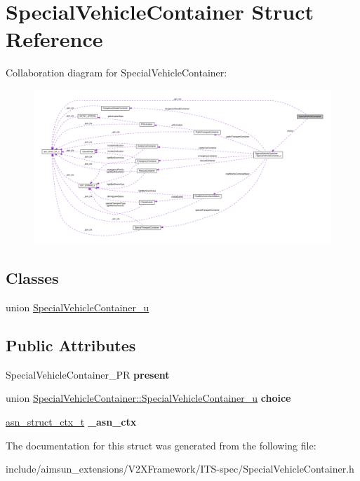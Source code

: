 \hypertarget{structSpecialVehicleContainer}{}\section{Special\+Vehicle\+Container Struct Reference}
\label{structSpecialVehicleContainer}


Collaboration diagram for Special\+Vehicle\+Container\+:\nopagebreak
\begin{figure}[H]
\begin{center}
\leavevmode
\includegraphics[width=350pt]{structSpecialVehicleContainer__coll__graph}
\end{center}
\end{figure}
\subsection*{Classes}
\begin{DoxyCompactItemize}
\item 
union \hyperlink{unionSpecialVehicleContainer_1_1SpecialVehicleContainer__u}{Special\+Vehicle\+Container\+\_\+u}
\end{DoxyCompactItemize}
\subsection*{Public Attributes}
\begin{DoxyCompactItemize}
\item 
Special\+Vehicle\+Container\+\_\+\+PR {\bfseries present}\hypertarget{structSpecialVehicleContainer_add8486aafe0d324460dacc8ac44a6cb6}{}\label{structSpecialVehicleContainer_add8486aafe0d324460dacc8ac44a6cb6}

\item 
union \hyperlink{unionSpecialVehicleContainer_1_1SpecialVehicleContainer__u}{Special\+Vehicle\+Container\+::\+Special\+Vehicle\+Container\+\_\+u} {\bfseries choice}\hypertarget{structSpecialVehicleContainer_a68cc2f4e8ea67d3753c3ef206366b25f}{}\label{structSpecialVehicleContainer_a68cc2f4e8ea67d3753c3ef206366b25f}

\item 
\hyperlink{structasn__struct__ctx__s}{asn\+\_\+struct\+\_\+ctx\+\_\+t} {\bfseries \+\_\+asn\+\_\+ctx}\hypertarget{structSpecialVehicleContainer_ade283cd7cb825e863bdc6020576b0fe7}{}\label{structSpecialVehicleContainer_ade283cd7cb825e863bdc6020576b0fe7}

\end{DoxyCompactItemize}


The documentation for this struct was generated from the following file\+:\begin{DoxyCompactItemize}
\item 
include/aimsun\+\_\+extensions/\+V2\+X\+Framework/\+I\+T\+S-\/spec/Special\+Vehicle\+Container.\+h\end{DoxyCompactItemize}
